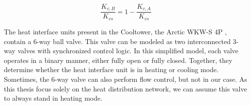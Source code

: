 \begin{equation}\label{eq::3way-valve}
    \frac{K_{v,B}}{K_{vs}} = 1 - \frac{K_{v,A}}{K_{vs}}
\end{equation}

The heat interface units present in the Cooltower, the Arctic WKW-S 4P \cite{fortes_wkw_s_4p}, contain a 6-way ball valve. This valve can be modeled as two interconnected 3-way valves with synchronized control logic. In this simplified model, each valve operates in a binary manner, either fully open or fully closed. Together, they determine whether the heat interface unit is in heating or cooling mode. Sometimes, the 6-way valve can also perform flow control, but not in our case. As this thesis focus solely on the heat distribution network, we can assume this valve to always stand in heating mode.


